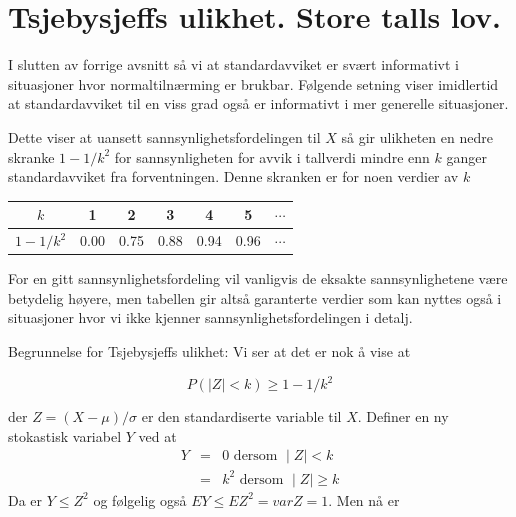 \section{Tsjebysjeffs ulikhet. Store talls lov.}

I slutten  av forrige avsnitt så vi at standardavviket er svært
informativt i situasjoner hvor normaltilnærming er brukbar.
Følgende setning viser imidlertid at standardavviket til en viss
grad også er informativt i mer generelle situasjoner.

\begin{center}  \end{center}

\noindent Dette viser at uansett sannsynlighetsfordelingen til $X$ så gir
ulikheten  en nedre skranke $1-1/k^2$
 for sannsynligheten for avvik i tallverdi mindre enn $k$
ganger standardavviket fra forventningen. Denne skranken er for
noen verdier av $k$

\begin{center}
\begin{tabular}{c|cccccc}
     $k$   &  1  &  2   &  3  &  4  &  5  &  $\cdots$ \\ \hline
 $1-1/k^2$ & 0.00& 0.75 & 0.88& 0.94& 0.96 & $\cdots$
\end{tabular}
\end{center}
\noindent For en gitt sannsynlighetsfordeling vil vanligvis de eksakte
sannsynlighetene være betydelig høyere, men tabellen gir altså
garanterte verdier som kan nyttes også i situasjoner hvor vi ikke
kjenner sannsynlighetsfordelingen i detalj.

\small
\noindent Begrunnelse for Tsjebysjeffs ulikhet: Vi ser at det er nok å
 vise at 

\[   P(\mid Z\mid < k) \geq 1-1/k^2 \]

\noindent der $Z=(X-\mu)/\sigma$ er den standardiserte variable til $X$.
Definer en ny stokastisk variabel $Y$ ved at
\begin{eqnarray*}
     Y&=&0  \mbox{\ \ \ \ dersom \ } \mid Z\mid < k \\
      &=&k^2 \mbox{\ \ \ dersom \ } \mid Z\mid \geq k
\end{eqnarray*}
\noindent Da er $Y\leq Z^2$ og følgelig også $EY\leq EZ^2=varZ=1$.
 Men nå er 

